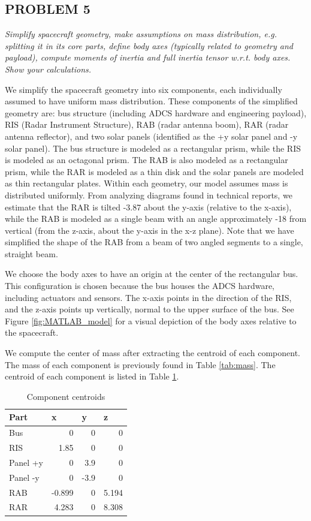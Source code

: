 \subsection{PROBLEM 5}
\textit{Simplify spacecraft geometry, make assumptions on mass distribution, e.g. splitting it in its core parts, define body axes (typically related to geometry and payload), compute moments of inertia and full inertia tensor w.r.t. body axes. Show your calculations.}

We simplify the spacecraft geometry into six components, each individually assumed to have uniform mass distribution. These components of the simplified geometry are: bus structure (including ADCS hardware and engineering payload), RIS (Radar Instrument Structure), RAB (radar antenna boom), RAR (radar antenna reflector), and two solar panels (identified as the +y solar panel and -y solar panel). The bus structure is modeled as a rectangular prism, while the RIS is modeled as an octagonal prism. The RAB is also modeled as a rectangular prism, while the RAR is modeled as a thin disk and the solar panels are modeled as thin rectangular plates. Within each geometry, our model assumes mass is distributed uniformly. From analyzing diagrams found in technical reports, we estimate that the RAR is tilted -3.87\degree{} about the y-axis (relative to the x-axis), while the RAB is modeled as a single beam with an angle approximately -18\degree{} from vertical (from the z-axis, about the y-axis in the x-z plane). Note that we have simplified the shape of the RAB from a beam of two angled segments to a single, straight beam.

We choose the body axes to have an origin at the center of the rectangular bus. This configuration is chosen because the bus houses the ADCS hardware, including actuators and sensors. The x-axis points in the direction of the RIS, and the z-axis points up vertically, normal to the upper surface of the bus. See Figure \ref{fig:MATLAB_model} for a visual depiction of the body axes relative to the spacecraft.

We compute the center of mass after extracting the centroid of each component. The mass of each component is previously found in Table \ref{tab:mass}. The centroid of each component is listed in Table \ref{tab:centroid}.

\begin{longtable}{l|r|r|r}
\caption{Component centroids}
\label{tab:centroid}\\
\textbf{Part} & \multicolumn{1}{l}{\textbf{x}} & \multicolumn{1}{l}{\textbf{y}} & \multicolumn{1}{l}{\textbf{z}} \\ \hline
\endfirsthead
%
\endhead
%
Bus      & 0     & 0    & 0    \\
RIS      & 1.85  & 0    & 0    \\
Panel +y & 0     & 3.9  & 0    \\
Panel -y & 0     & -3.9 & 0    \\
RAB      & -0.899 & 0    & 5.194 \\
RAR      & 4.283   & 0    & 8.308
\end{longtable}


